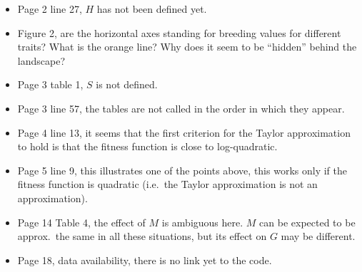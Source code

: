 \documentclass[11pt,a4paper]{article}
\begin{document}
\begin{revquote}
\begin{itemize}
  \item Page 2 line 27, $H$ has not been defined yet.
  \item Figure 2, are the horizontal axes standing for breeding values for different traits? What is the orange line? Why does it seem to be ``hidden'' behind the landscape?
  \item Page 3 table 1, $S$ is not defined.
  \item Page 3 line 57, the tables are not called in the order in which they appear.
  \item Page 4 line 13, it seems that the first criterion for the Taylor approximation to hold is that the fitness function is close to log-quadratic.
  \item Page 5 line 9, this illustrates one of the points above, this works only if the fitness function is quadratic (i.e.\ the Taylor approximation is not an approximation).
  \item Page 14 Table 4, the effect of $M$ is ambiguous here. $M$ can be expected to be approx.\ the same in all these situations, but its effect on $G$ may be different.
  \item Page 18, data availability, there is no link yet to the code.
\end{itemize}
\end{revquote}
\end{document}
